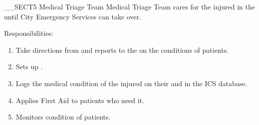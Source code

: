 __SECT5{ Medical Triage Team
\label{sec:MedicalTriageTeam} }
Medical Triage Team cares for the injured in the \MedicalTriageArea
until City Emergency Services can take over.

Responsibilities:
\begin{enumerate}
\item Take directions from and reports to the \MedicalGroupLeader on the conditions of patients.
\item Sets up \MedicalTriageArea.
\item Logs the medical condition of the injured on their \MedicalTriageTag and in the ICS database.
\item Applies First Aid to patients who need it.
\item Monitors condition of patients.
\end{enumerate}

